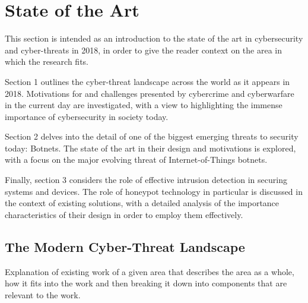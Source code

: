 \chapter{State of the Art}

This section is intended as an introduction to the state of the art in cybersecurity and cyber-threats in 2018, in order to give the reader context on the area in which the research fits.

Section 1 outlines the cyber-threat landscape across the world as it appears in 2018. Motivations for and challenges presented by cybercrime and cyberwarfare in the current day are investigated, with a view to highlighting the immense importance of cybersecurity in society today.

Section 2 delves into the detail of one of the biggest emerging threats to security today: Botnets. The state of the art in their design and motivations is explored, with a focus on the major evolving threat of Internet-of-Things botnets.

Finally, section 3 considers the role of effective intrusion detection in securing systems and devices. The role of honeypot technology in particular is discussed in the context of existing solutions, with a detailed analysis of the importance characteristics of their design in order to employ them effectively.



\section{The Modern Cyber-Threat Landscape}

Explanation of existing work of a given area that describes the area as a whole, how it fits into the work and then breaking it down into components that are relevant to the work.

